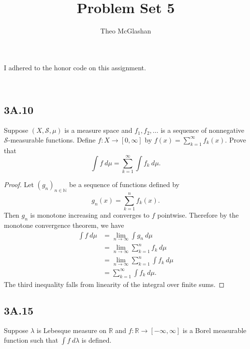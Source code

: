 \documentclass[12pt]{article}
\title{Problem Set 5}
\author{Theo McGlashan}
\date{}
\newcommand{\R}{\mathbb{R}}
\newcommand{\N}{\mathbb{N}}
\newcommand{\eq}[1]{\begin{equation*}#1\end{equation*}}
\newcommand{\al}[1]{\begin{align*}#1\end{align*}}
\begin{document}
\maketitle
\begin{center}
    I adhered to the honor code on this assignment. \\
\end{center}
\newpage
\
\newpage
\subsection*{3A.10}
Suppose $(X, \mathcal{S}, \mu)$ is a measure space and $f_1, f_2, \ldots$ is a sequence of nonnegative $\mathcal{S}$-measurable functions. Define $f : X \to [0, \infty]$ by $f(x) = \sum_{k=1}^\infty f_k(x)$. Prove that \eq{\int f ~d \mu = \sum_{k=1}^\infty \int f_k ~d \mu.}

\begin{proof}

    Let $(g_n)_{n \in \N}$ be a sequence of functions defined by
    \eq{g_n(x) = \sum_{k=1}^{n} f_k (x).} Then $g_n$ is monotone increasing and converges to $f$ pointwise. Therefore by the monotone convergence theorem, we have \al{\int f ~d \mu &= \lim_{n \to \infty} \int g_n ~d \mu \\
                      &= \lim_{n \to \infty} \sum_{k=1}^{n} f_k ~d \mu \\
                      &= \lim_{n \to \infty} \sum_{k=1}^{n} \int f_k ~d \mu \\
                      &= \sum_{k=1}^{\infty} \int f_k ~d \mu.}
    The third inequality falls from linearity of the integral over finite sums.
\end{proof}

\subsection*{3A.15}
Suppose $\lambda$ is Lebesque measure on $\R$ and $f : \R \to [-\infty, \infty]$ is a Borel measurable function such that $\int f ~d \lambda$ is defined.
\end{document}
